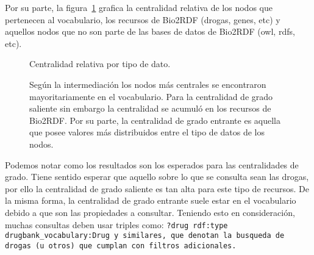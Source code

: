 Por su parte, la figura~\ref{fig:comptype} grafica la centralidad relativa de
los nodos que pertenecen al vocabulario, los recursos de Bio2RDF (drogas, genes,
etc) y aquellos nodos que no son parte de las bases de datos de Bio2RDF (owl,
rdfs, etc).
\begin{figure}[h]
  \caption{Centralidad relativa por tipo de dato.}
  \vspace{-.2cm}
  \caption*{\small
    Según la intermediación los nodos más centrales se encontraron
    mayoritariamente en el vocabulario. Para la centralidad de grado
    saliente sin embargo la centralidad se acumuló en los recursos de Bio2RDF.
    Por su parte, la centralidad de grado entrante es aquella que posee valores
    más distribuidos entre el tipo de datos de los nodos.
  }
  \label{fig:comptype}
\end{figure}

Podemos notar como los resultados son los esperados para las centralidades de
grado.
Tiene sentido esperar que aquello sobre lo que se consulta sean las  drogas, por
ello la centralidad de grado saliente es tan alta para este tipo de recursos.
De la misma forma, la centralidad de grado entrante suele estar en el
vocabulario debido a que son las propiedades a consultar.
Teniendo esto en consideración, muchas consultas deben usar triples
como: \tt{?drug rdf:type drugbank\_vocabulary:Drug} y similares, que denotan la
busqueda de drogas (u otros) que cumplan con filtros adicionales.


